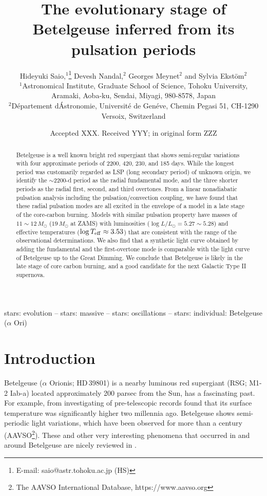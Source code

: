 \documentclass[fleqn,usenatbib]{mnras}
\title[Evolutionary stage of Betelgeuse]{The evolutionary stage of Betelgeuse inferred from its pulsation periods}
\author[H. Saio et al.]{
Hideyuki Saio,$^{1}$\thanks{E-mail: saio@astr.tohoku.ac.jp (HS)}
Devesh Nandal,$^{2}$
Georges Meynet$^{2}$
and Sylvia Ekst\"om$^{2}$
\\
$^{1}$Astronomical Institute, Graduate School of Science, Tohoku University, Aramaki, Aoba-ku, Sendai, Miyagi, 980-8578, Japan\\
$^{2}$D\'epartement d\'Astronomie, Universit\'e de Gen\'eve, Chemin Pegasi 51, CH-1290 Versoix, Switzerland
}
\date{Accepted XXX. Received YYY; in original form ZZZ}
\begin{document}
\label{firstpage}
\pagerange{\pageref{firstpage}--\pageref{lastpage}}
\maketitle

\begin{abstract}
Betelgeuse is a well known bright red supergiant that shows semi-regular 
variations with four approximate periods of 2200, 420, 230, and 185 days. 
While the longest period was customarily regarded as 
LSP (long secondary period) of unknown origin, 
we identify the $\sim$2200-d period as the radial fundamental mode, and 
the three shorter periods as the radial first, second, and third overtones. 
From a linear nonadiabatic pulsation analysis including the pulsation/convection coupling,
we have found that these radial pulsation modes are all excited in the
envelope of a model in a late stage of the core-carbon burning.
Models with similar pulsation property
have masses  of $11\sim12\,M_\odot$ ($19\,M_\odot$ at ZAMS) with 
luminosities ($\log L/L_\odot =5.27\sim5.28$) and effective temperatures
($\log T_{\rm eff}\approx 3.53$) that are  
consistent with the range of the observational determinations.
We also find that a synthetic light curve obtained by adding 
the fundamental and the first-overtone mode is comparable
with the light curve of Betelgeuse up to the Great Dimming. 
We conclude that Betelgeuse is likely in the late stage of core carbon burning, 
and a good candidate for the next Galactic Type II supernova.  
\end{abstract}

\begin{keywords}
stars: evolution -- stars: massive -- stars: oscillations -- stars: individual: Betelgeuse ($\alpha$ Ori)
\end{keywords}



\section{Introduction}

Betelgeuse ($\alpha$ Orionis; HD\,39801) is a nearby luminous red supergiant 
(RSG; M1-2 Iab-a) located approximately 200 parsec from
the Sun, has a fascinating past. 
For example, from investigating of pre-telescopic records
\citet{Neuhauser2022} found that its surface temperature was significantly 
higher two millennia ago. 
Betelgeuse shows semi-periodic light variations, which have been observed 
for more than a century (AAVSO\footnote{The AAVSO International Database, https://www.aavso.org}).
These and other very interesting phenomena that occurred in and around Betelgeuse are nicely reviewed in \citet{Wheeler2023}.
\end{document}
